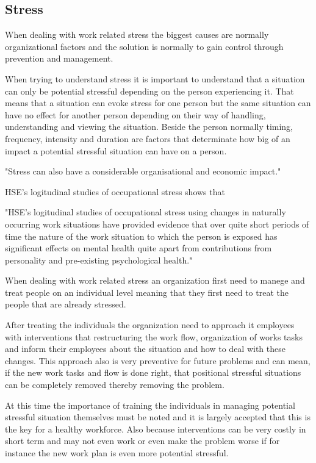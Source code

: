 \subsection{Stress}
When dealing with work related stress the biggest causes are normally organizational factors and the solution is normally to gain control through prevention and management.

When trying to understand stress it is important to understand that a situation can only be potential stressful depending on the person experiencing it. That means that a situation can evoke stress for one person but the same situation can have no effect for another person depending on their way of handling, understanding and viewing the situation. Beside the person normally timing, frequency, intensity and duration are factors that determinate how big of an impact a potential stressful situation can have on a person.

"Stress can also have a considerable organisational and economic impact."

HSE's  logitudinal studies of occupational stress shows that 

"HSE's  logitudinal studies of occupational stress using changes in naturally occurring work situations have provided evidence that over quite short periods of time the nature of the work situation to which the person is exposed has significant effects on mental health quite apart from contributions from personality and pre-existing psychological health."

When dealing with work related stress an organization first need to manege and treat people on an individual level meaning that they first need to treat the people that are already stressed.

After treating the individuals the organization need to approach it employees with interventions that restructuring the work flow, organization of works tasks and inform their employees about the situation and how to deal with these changes. This approach also is very preventive for future problems and can mean, if the new work tasks and flow is done right, that positional stressful situations can be completely removed thereby removing the problem.

At this time the importance of training the individuals in managing potential stressful situation themselves must be noted and it is largely accepted that this is the key for a healthy workforce. Also because interventions can be very costly in short term and may not even work or even make the problem worse if for instance the new work plan is even more potential stressful.

